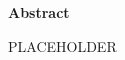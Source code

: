 \newenvironment{abstract}%
    {\cleardoublepage\thispagestyle{empty}\null\vfill\begin{center}%
    \bfseries Abstract \end{center}}%
    {\vfill\null}
        \begin{abstract}
        \begin{center}
          PLACEHOLDER
          \end{center}
        \end{abstract}
